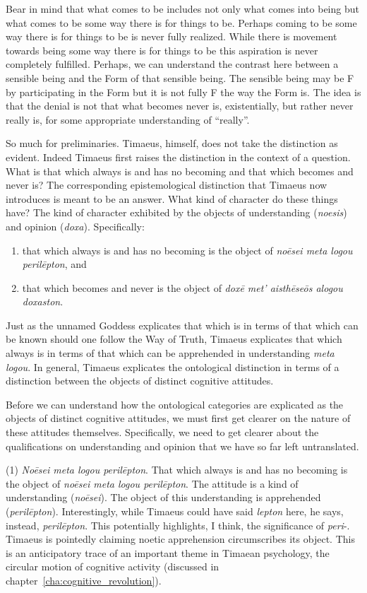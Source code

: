 Bear in mind that what comes to be includes not only what comes into being but what comes to be some way there is for things to be. Perhaps coming to be some way there is for things to be is never fully realized. While there is movement towards being some way there is for things to be this aspiration is never completely fulfilled. Perhaps, we can understand the contrast here between a sensible being and the Form of that sensible being. The sensible being may be F by participating in the Form but it is not fully F the way the Form is. The idea is that the denial is not that what becomes never is, existentially, but rather never really is, for some appropriate understanding of ``really''.

So much for preliminaries. Timaeus, himself, does not take the distinction as evident. Indeed Timaeus first raises the distinction in the context of a question. What is that which always is and has no becoming and that which becomes and never is? The corresponding epistemological distinction that Timaeus now introduces is meant to be an answer.  What kind of character do these things have? The kind of character exhibited by the objects of understanding (\emph{noesis}) and opinion (\emph{doxa}). Specifically: 
\begin{enumerate}[(1)]
	\item that which always is and has no becoming is the object of \emph{noēsei meta logou perilēpton}, and
	\item that which becomes and never is the object of \emph{doxē met' aisthēseōs alogou doxaston}.
\end{enumerate}
Just as the unnamed Goddess explicates that which is in terms of that which can be known should one follow the Way of Truth, Timaeus explicates that which always is in terms of that which can be apprehended in understanding \emph{meta logou}. In general, Timaeus explicates the ontological distinction in terms of a distinction between the objects of distinct cognitive attitudes.

Before we can understand how the ontological categories are explicated as the objects of distinct cognitive attitudes, we must first get clearer on the nature of these attitudes themselves. Specifically, we need to get clearer about the qualifications on understanding and opinion that we have so far left untranslated. 

(1) \emph{Noēsei meta logou perilēpton}. That which always is and has no becoming is the object of \emph{noēsei meta logou perilēpton}. The attitude is a kind of understanding (\emph{noēsei}). The object of this understanding is apprehended (\emph{perilēpton}). Interestingly, while Timaeus could have said \emph{lepton} here, he says, instead, \emph{perilēpton}. This potentially highlights, I think, the significance of \emph{peri}-. Timaeus is pointedly claiming noetic apprehension circumscribes its object. This is an anticipatory trace of an important theme in Timaean psychology, the circular motion of cognitive activity (discussed in chapter~\ref{cha:cognitive_revolution}).

